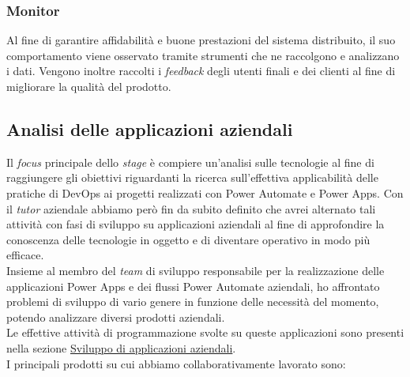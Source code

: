\subsubsection*{Monitor}
Al fine di garantire affidabilità e buone prestazioni del sistema distribuito, il suo comportamento viene osservato tramite strumenti che ne raccolgono e analizzano i dati. 
Vengono inoltre raccolti i \emph{feedback} degli utenti finali e dei clienti al fine di migliorare la qualità del prodotto. 

\subsection{Analisi delle applicazioni aziendali}
Il \emph{focus} principale dello \emph{stage} è compiere un'analisi sulle tecnologie al fine di raggiungere gli obiettivi riguardanti la ricerca sull'effettiva applicabilità delle pratiche di \gls{DevOps} ai progetti realizzati con Power Automate e Power Apps.
Con il \emph{tutor} aziendale abbiamo però fin da subito definito che avrei alternato tali attività con fasi di sviluppo su applicazioni aziendali al fine di approfondire la conoscenza delle tecnologie in oggetto e di diventare operativo in modo più efficace.\\
Insieme al membro del \emph{team} di sviluppo responsabile per la realizzazione delle applicazioni Power Apps e dei flussi Power Automate aziendali, ho affrontato problemi di sviluppo di vario genere in funzione delle necessità del momento, potendo analizzare diversi prodotti aziendali.\\
Le effettive attività di programmazione svolte su queste applicazioni sono presenti nella sezione \hyperref[sviluppoApplicazioni]{Sviluppo di applicazioni aziendali}.\\
I principali prodotti su cui abbiamo collaborativamente lavorato sono:
